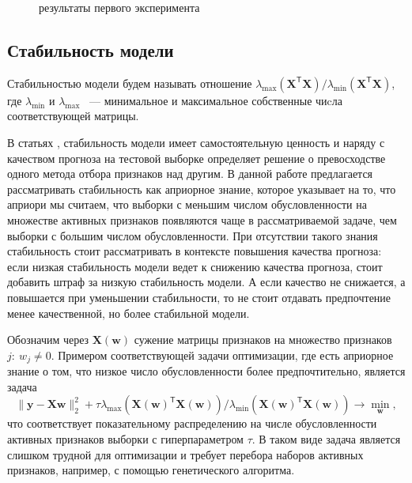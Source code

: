 \documentclass[12pt, twoside]{article}
\newcommand{\by}{\mathbf{y}}
\newcommand{\bw}{\mathbf{w}}
\newcommand{\bX}{\mathbf{X}}
\newcommand{\getT}{^{\mathsf{T}}}
\begin{document}
\newpage

\begin{figure}[!htb]
\caption{результаты первого эксперимента}
\label{first_exp}
\end{figure}

\subsection{Стабильность модели}
Стабильностью модели будем называть отношение $\lambda_{\max}(\bX\getT\bX) / \lambda_{\min}(\bX\getT\bX)$, где $\lambda_{\min}$ и $\lambda_{\max}$ ~--- минимальное и максимальное собственные чиcла соответствующей матрицы.

В статьях \cite{Katrutsa15, KatrutsaS17},  стабильность модели имеет самостоятельную ценность и наряду с качеством прогноза на тестовой выборке определяет решение о превосходстве одного метода отбора признаков над другим. В данной работе предлагается рассматривать стабильность как априорное знание, которое указывает на то, что априори мы считаем, что выборки с меньшим числом обусловленности на множестве активных признаков появляются чаще в рассматриваемой задаче, чем выборки с большим числом обусловленности. При отсутствии такого знания стабильность стоит рассматривать в контексте повышения качества прогноза: если низкая стабильность модели ведет к снижению качества прогноза, стоит добавить штраф за низкую стабильность модели. А если качество не снижается, а повышается при уменьшении стабильности, то не стоит отдавать предпочтение менее качественной, но более стабильной модели. 

Обозначим через $\bX(\bw)$ сужение матрицы признаков на множество признаков $j:\:w_j \neq 0$. Примером соответствующей задачи оптимизации, где есть априорное знание о том, что низкое число обусловленности более предпочтительно, является задача 
$$
\|\by - \bX \bw\|_2^2 + \tau \lambda_{\max}(\bX(\bw)\getT\bX(\bw)) / \lambda_{\min}(\bX(\bw)\getT\bX(\bw)) \to \min_{\bw},
$$
что соответствует показательному распределению на числе обусловленности активных признаков выборки с гиперпараметром $\tau$. В таком виде задача является слишком трудной для оптимизации и требует перебора наборов активных признаков, например, с помощью генетического алгоритма.
\end{document}
